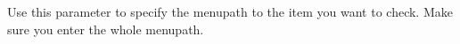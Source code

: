 

Use this parameter to specify the menupath to the item you want to check. Make sure you enter the whole menupath. 



